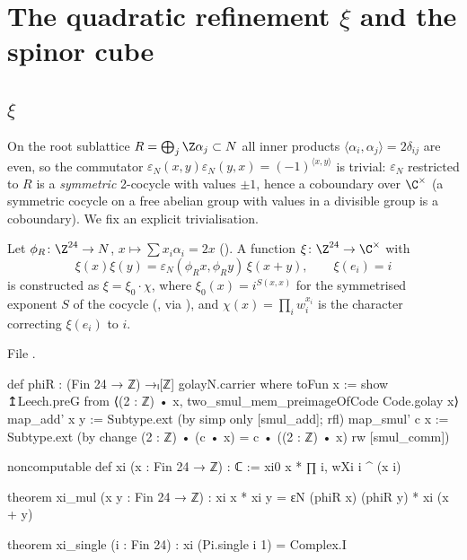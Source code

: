\section{\texorpdfstring{The quadratic refinement $\xi$ and the spinor cube}{The quadratic refinement xi and the spinor cube}}\label{ch13:sec:xi}

\subsection{\texorpdfstring{$\xi$}{xi}}
On the root sublattice $R=\bigoplus_j\Z\alpha_j\subset N$ all inner products $\langle\alpha_i,\alpha_j\rangle=2\delta_{ij}$ are
even, so the commutator $\varepsilon_N(x,y)\varepsilon_N(y,x)=(-1)^{\langle x,y\rangle}$ is trivial: $\varepsilon_N$ restricted to $R$
is a \emph{symmetric} 2-cocycle with values $\pm1$, hence a coboundary over $\C^\times$ (a symmetric cocycle
on a free abelian group with values in a divisible group is a coboundary). We fix an explicit
trivialisation.
\begin{definition}[\lean{xi}]\label{ch13:def:xi}
Let $\phi_R\colon\Z^{24}\to N$, $x\mapsto\sum x_i\alpha_i=2x$ (). A function $\xi\colon\Z^{24}\to\C^\times$ with
\begin{equation*}
  \xi(x)\xi(y)=\varepsilon_N(\phi_Rx,\phi_Ry)\,\xi(x+y),\qquad \xi(e_i)=i
\end{equation*}
is constructed as $\xi=\xi_0\cdot\chi$, where $\xi_0(x)=i^{S(x,x)}$ for the symmetrised exponent $S$ of the
cocycle (, via ), and $\chi(x)=\prod_iw_i^{x_i}$ is the character correcting
$\xi(e_i)$ to $i$.
\end{definition}
\noindent File .
\begin{leancode}
def phiR : (Fin 24 → ℤ) →ₗ[ℤ] golayN.carrier where
  toFun x := show ↥Leech.preG from ⟨(2 : ℤ) • x, two_smul_mem_preimageOfCode Code.golay x⟩
  map_add' x y := Subtype.ext (by simp only [smul_add]; rfl)
  map_smul' c x := Subtype.ext (by
    change (2 : ℤ) • (c • x) = c • ((2 : ℤ) • x)
    rw [smul_comm])

noncomputable def xi (x : Fin 24 → ℤ) : ℂ := xi0 x * ∏ i, wXi i ^ (x i)

theorem xi_mul (x y : Fin 24 → ℤ) : xi x * xi y = εN (phiR x) (phiR y) * xi (x + y)

theorem xi_single (i : Fin 24) : xi (Pi.single i 1) = Complex.I
\end{leancode}
